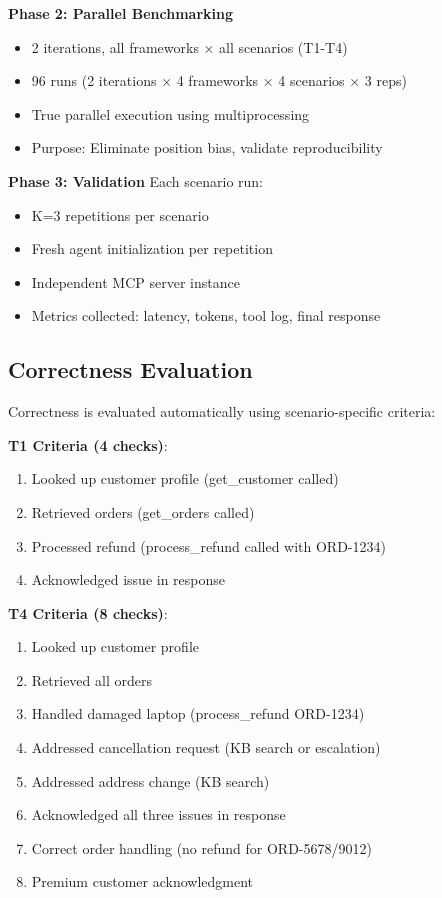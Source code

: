 \documentclass[sigconf,nonacm]{acmart}
\begin{document}
\textbf{Phase 2: Parallel Benchmarking}
\begin{itemize}
\item 2 iterations, all frameworks × all scenarios (T1-T4)
\item 96 runs (2 iterations × 4 frameworks × 4 scenarios × 3 reps)
\item True parallel execution using multiprocessing
\item Purpose: Eliminate position bias, validate reproducibility
\end{itemize}

\textbf{Phase 3: Validation}
Each scenario run:
\begin{itemize}
\item K=3 repetitions per scenario
\item Fresh agent initialization per repetition
\item Independent MCP server instance
\item Metrics collected: latency, tokens, tool log, final response
\end{itemize}

\subsection{Correctness Evaluation}

Correctness is evaluated automatically using scenario-specific criteria:

\textbf{T1 Criteria (4 checks)}:
\begin{enumerate}
\item Looked up customer profile (get\_customer called)
\item Retrieved orders (get\_orders called)
\item Processed refund (process\_refund called with ORD-1234)
\item Acknowledged issue in response
\end{enumerate}

\textbf{T4 Criteria (8 checks)}:
\begin{enumerate}
\item Looked up customer profile
\item Retrieved all orders
\item Handled damaged laptop (process\_refund ORD-1234)
\item Addressed cancellation request (KB search or escalation)
\item Addressed address change (KB search)
\item Acknowledged all three issues in response
\item Correct order handling (no refund for ORD-5678/9012)
\item Premium customer acknowledgment
\end{enumerate}
\end{document}
